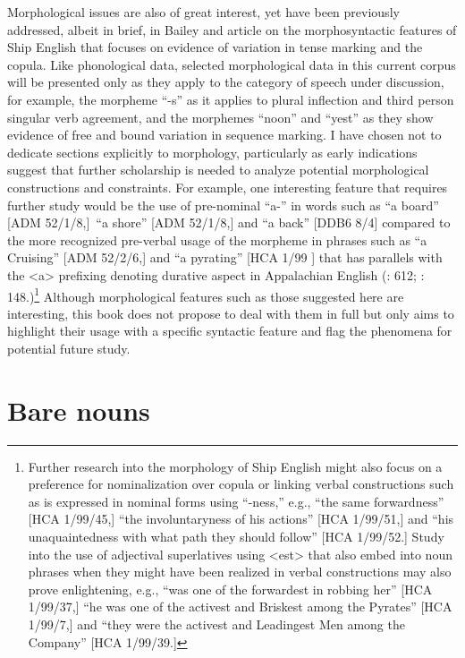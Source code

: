 Morphological issues are also of great interest, yet have been previously addressed, albeit in brief, in Bailey and  article on the morphosyntactic features of Ship English that focuses on evidence of variation in tense marking and the copula. Like phonological data, selected morphological data in this current corpus will be presented only as they apply to the category of speech under discussion, for example, the morpheme “-s” as it applies to plural inflection and third person singular verb agreement, and the morphemes “noon” and “yest” as they show evidence of free and bound variation in sequence marking. I have chosen not to dedicate sections explicitly to morphology, particularly as early indications suggest that further scholarship is needed to analyze potential morphological constructions and constraints. For example, one interesting feature that requires further study would be the use of pre-nominal “a-” in words such as “a board” [ADM 52/1/8,]~“a shore” [ADM 52/1/8,] and “a back” [DDB6 8/4] compared to the more recognized pre-verbal usage of the morpheme in phrases such as “a Cruising” [ADM 52/2/6,] and “a pyrating” [HCA 1/99 \citealt{Barbados1733}] that has parallels with the <a> prefixing denoting durative aspect in Appalachian English (\citealt{Hickey2004}: 612; \citealt{Montgomery2001}: 148.)\footnote{Further research into the morphology of Ship English might also focus on a preference for nominalization over copula or linking verbal constructions such as is expressed in nominal forms using “-ness,” e.g., “the same forwardness” [HCA 1/99/45,] “the involuntaryness of his actions” [HCA 1/99/51,] and “his unaquaintedness with what path they should follow” [HCA 1/99/52.] Study into the use of adjectival superlatives using <est> that also embed into noun phrases when they might have been realized in verbal constructions may also prove enlightening, e.g., “was one of the forwardest in robbing her” [HCA 1/99/37,] “he was one of the activest and Briskest among the Pyrates” [HCA 1/99/7,] and “they were the activest and Leadingest Men among the Company” [HCA 1/99/39.]} Although morphological features such as those suggested here are interesting, this book does not propose to deal with them in full but only aims to highlight their usage with a specific syntactic feature and flag the phenomena for potential future study. 

\section{\textbf{Bare} \textbf{nouns}}%

